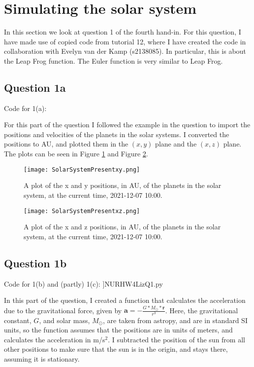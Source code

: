 \section{Simulating the solar system}

In this section we look at question 1 of the fourth hand-in. 
For this question, I have made use of copied code from tutorial 12, where I have created the code in collaboration with Evelyn van der Kamp (s2138085). 
In particular, this is about the Leap Frog function. The Euler function is very similar to Leap Frog.

\subsection{Question 1a}

Code for 1(a):


For this part of the question I followed the example in the question to import the positions and velocities of the planets in the solar systems.
I converted the positions to AU, and plotted them in the $(x,y)$ plane and the $(x,z)$ plane.
The plots can be seen in Figure \ref{fig:SSxy} and Figure \ref{fig:SSxz}.

\begin{figure}[ht!]
  \centering
  \texttt{[image: SolarSystemPresentxy.png]}
  \caption{A plot of the x and y positions, in AU, of the planets in the solar system, at the current time, 2021-12-07 10:00.}
  \label{fig:SSxy}
\end{figure}

\begin{figure}[ht!]
  \centering
  \texttt{[image: SolarSystemPresentxz.png]}
  \caption{A plot of the x and z positions, in AU, of the planets in the solar system, at the current time, 2021-12-07 10:00.}
  \label{fig:SSxz}
\end{figure}

\subsection{Question 1b}

Code for 1(b) and (partly) 1(c):
]{NURHW4LizQ1.py}

In this part of the question, I created a function that calculates the acceleration due to the gravitational force, given by $\textbf{a} = -\frac{G*M_{\odot}*\textbf{r}}{r^3}$.
Here, the gravitational constant, $G$, and solar mass, $M_{\odot}$, are taken from astropy, and are in standard SI units, so the function assumes that the positions are in units of meters, and calculates the acceleration in m/s$^2$.
I subtracted the position of the sun from all other positions to make sure that the sun is in the origin, and stays there, assuming it is stationary.

